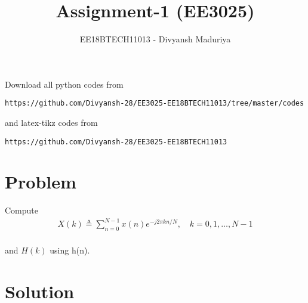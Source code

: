 \documentclass[journal,12pt,twocolumn]{IEEEtran}
\begin{document}
\title{Assignment-1 (EE3025)}
\author{EE18BTECH11013 - Divyansh Maduriya}
\maketitle
\newpage
\bigskip
\renewcommand{\thefigure}{\theenumi}
\renewcommand{\thetable}{\theenumi}
Download all python codes from 
\begin{lstlisting}
https://github.com/Divyansh-28/EE3025-EE18BTECH11013/tree/master/codes
\end{lstlisting}
%
and latex-tikz codes from 
%
\begin{lstlisting}
https://github.com/Divyansh-28/EE3025-EE18BTECH11013
\end{lstlisting}
\section{Problem}
Compute 
\begin{align}
	X(k) \triangleq \sum_{n=0}^{N-1} x(n) e^{-j 2 \pi k n / N}, \quad k=0,1, \ldots, N-1
\end{align}\\
and $H(k)$ using h(n).
\section{Solution}
\end{document}
